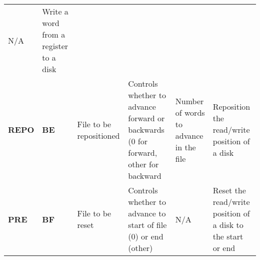 \documentclass[]{article}
\begin{document}
\begin{longtable}[c]{@{}llllll@{}}
\begin{minipage}[t]{0.14\columnwidth}
N/A
\strut\end{minipage} &
\begin{minipage}[t]{0.14\columnwidth}\raggedright\strut
Write a word from a register to a disk
\strut\end{minipage}\tabularnewline
\begin{minipage}[t]{0.14\columnwidth}\raggedright\strut
\textbf{REPO}
\strut\end{minipage} &
\begin{minipage}[t]{0.14\columnwidth}\raggedright\strut
\textbf{BE}
\strut\end{minipage} &
\begin{minipage}[t]{0.14\columnwidth}\raggedright\strut
File to be repositioned
\strut\end{minipage} &
\begin{minipage}[t]{0.14\columnwidth}\raggedright\strut
Controls whether to advance forward or backwards (0 for forward, other
for backward
\strut\end{minipage} &
\begin{minipage}[t]{0.14\columnwidth}\raggedright\strut
Number of words to advance in the file
\strut\end{minipage} &
\begin{minipage}[t]{0.14\columnwidth}\raggedright\strut
Reposition the read/write position of a disk
\strut\end{minipage}\tabularnewline
\begin{minipage}[t]{0.14\columnwidth}\raggedright\strut
\textbf{PRE}
\strut\end{minipage} &
\begin{minipage}[t]{0.14\columnwidth}\raggedright\strut
\textbf{BF}
\strut\end{minipage} &
\begin{minipage}[t]{0.14\columnwidth}\raggedright\strut
File to be reset
\strut\end{minipage} &
\begin{minipage}[t]{0.14\columnwidth}\raggedright\strut
Controls whether to advance to start of file (0) or end (other)
\strut\end{minipage} &
\begin{minipage}[t]{0.14\columnwidth}\raggedright\strut
N/A
\strut\end{minipage} &
\begin{minipage}[t]{0.14\columnwidth}\raggedright\strut
Reset the read/write position of a disk to the start or end
\strut\end{minipage}\tabularnewline

\end{longtable}
\end{document}
